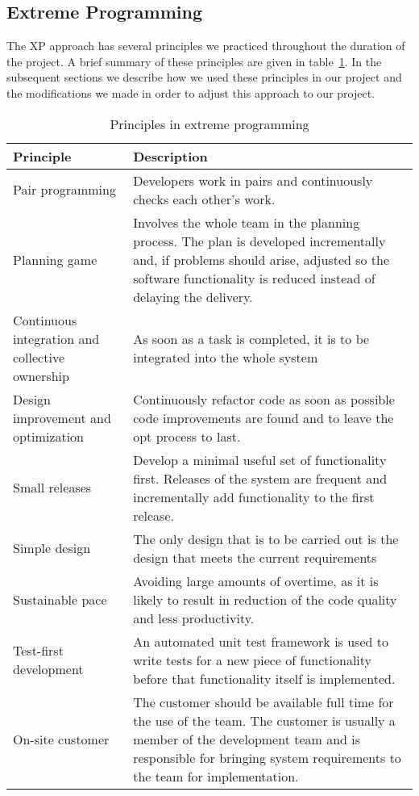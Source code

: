 \subsection{Extreme Programming}
The XP approach has several principles we practiced throughout the duration of the project. A brief summary of these principles are given in table~\ref{tab:exProg}. In the subsequent sections we describe how we used these principles in our project and the modifications we made in order to adjust this approach to our project.

\begin{table}[H]
\begin{tabular}{|p{4cm}|p{11.7cm}|}
\hline
Principle & Description \\\hline
Pair programming & Developers work in pairs and continuously checks each other's work.\\\hline
Planning game & Involves the whole team in the planning process. The plan is developed incrementally and, if problems should arise, adjusted so the software functionality is reduced instead of delaying the delivery.
\\\hline
Continuous integration and collective ownership& As soon as a task is completed, it is to be integrated into the whole system\\\hline
Design improvement and optimization & Continuously refactor code as soon as possible code improvements are found and to leave the \gls{opt} process to last. \\\hline
Small releases & Develop a minimal useful set of functionality first. Releases of the system are frequent and incrementally add functionality to the first release.\\\hline
Simple design & The only design that is to be carried out is the design that meets the current requirements\\\hline
Sustainable pace & Avoiding large amounts of overtime, as it is likely to result in reduction of the code quality and less productivity. \\\hline
Test-first development & An automated unit test framework is used to write tests for a new piece of functionality before that functionality itself is implemented. \\\hline
On-site customer & The customer should be available full time for the use of the team. The customer is usually a member of the development team and is responsible for bringing system requirements to the team for implementation.\\\hline
\end{tabular}
\caption{Principles in extreme programming}
\label{tab:exProg}
\end{table}

